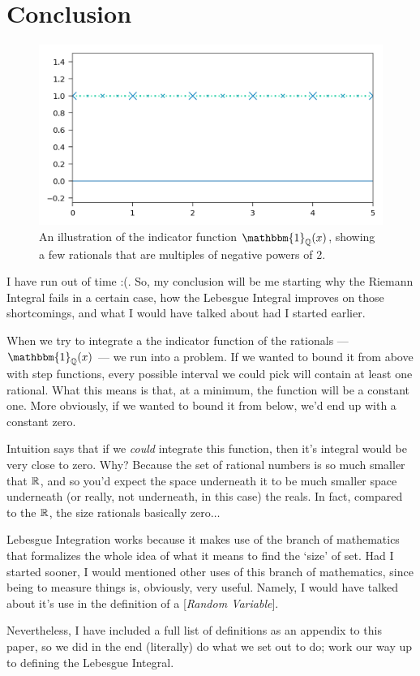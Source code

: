 

\section{Conclusion}
\begin{figure}[ht]
	\centering
	\includegraphics{Code/Rational.png}
	\caption{An illustration of the indicator function $\mathbbm{1}_\Q(x)$, showing a few rationals that are multiples of negative powers of 2.}
	\label{fig:rational}
\end{figure}

I have run out of time :(. So, my conclusion will be me starting why the Riemann Integral fails in a certain case, how the Lebesgue Integral improves on those shortcomings, and what I would have talked about had I started earlier. 

\medskip
When we try to integrate a the indicator function of the rationals --- $\mathbbm{1}_\Q(x)$ --- we run into a problem. If we wanted to bound it from above with step functions, every possible interval we could pick will contain at least one rational. What this means is that, at a minimum, the function will be a constant one. More obviously, if we wanted to bound it from below, we'd end up with a constant zero.

\medskip
Intuition says that if we \emph{could} integrate this function, then it's integral would be very close to zero. Why? Because the set of rational numbers is so much smaller that $\mathbb{R}$, and so you'd expect the space underneath it to be much smaller space underneath (or really, not underneath, in this case) the reals. In fact, compared to the $\mathbb{R}$, the size rationals basically zero$\ldots$

\medskip
Lebesgue Integration works because it makes use of the branch of mathematics that formalizes the whole idea of what it means to find the `size' of set. Had I started sooner, I would mentioned other uses of this branch of mathematics, since being to measure things is, obviously, very useful. Namely, I would have talked about it's use in the definition of a [\emph{Random Variable}].

\medskip
Nevertheless, I have included a full list of definitions as an appendix to this paper, so we did in the end (literally) do what we set out to do; work our way up to defining the Lebesgue Integral.